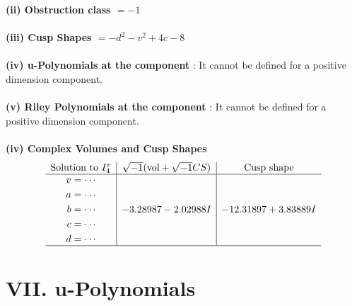 \documentclass[1p]{elsarticle_modified}
\theoremstyle{definition}
\newcommand{\I}{\sqrt{-1}}
\begin{document}
\flushleft \textbf{(ii) Obstruction class $= -1$}\\~\\
\flushleft \textbf{(iii) Cusp Shapes $= - d^2- v^2+4 c-8$}\\~\\
\flushleft \textbf{(iv) u-Polynomials at the component} : It cannot be defined for a positive dimension component.\\~\\
\flushleft \textbf{(v) Riley Polynomials at the component} : It cannot be defined for a positive dimension component.\\~\\
\newpage\flushleft \textbf{(iv) Complex Volumes and Cusp Shapes}
$$\begin{array}{c|c|c} 
\text{Solution to }I^v_{4}& \I (\text{vol} + \sqrt{-1}CS) & \text{Cusp shape}\\
 \hline 
\begin{aligned}
v &= \cdots \\
a &= \cdots \\
b &= \cdots \\
c &= \cdots \\
d &= \cdots\end{aligned}
 & -3.28987 - 2.02988 I & -12.31897 + 3.83889 I\\
 \hline 
 \end{array}
$$
\newpage\renewcommand{\arraystretch}{1}
\centering \section*{ VII. u-Polynomials}
\end{document}
